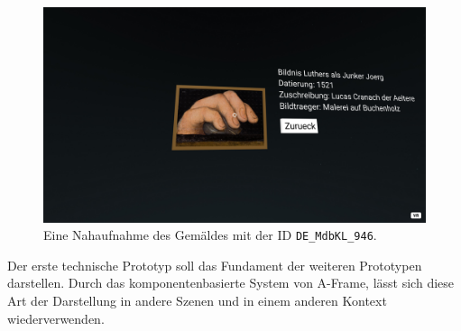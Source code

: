 \documentclass[a4paper,12pt,oneside]{article}
\begin{document}
        \begin{figure}
          \centering
          \includegraphics[scale=0.3]{img/coding/paintings-builder5.png}
          \caption{Eine Nahaufnahme des Gemäldes mit der ID \texttt{DE\_MdbKL\_946}.}
          \label{fig:paintings-builder5}
        \end{figure}
        Der erste technische Prototyp soll das Fundament der weiteren 
        Prototypen darstellen. Durch das komponentenbasierte System von
        A-Frame, lässt sich diese Art der Darstellung in andere Szenen
        und in einem anderen Kontext wiederverwenden.
\end{document}
